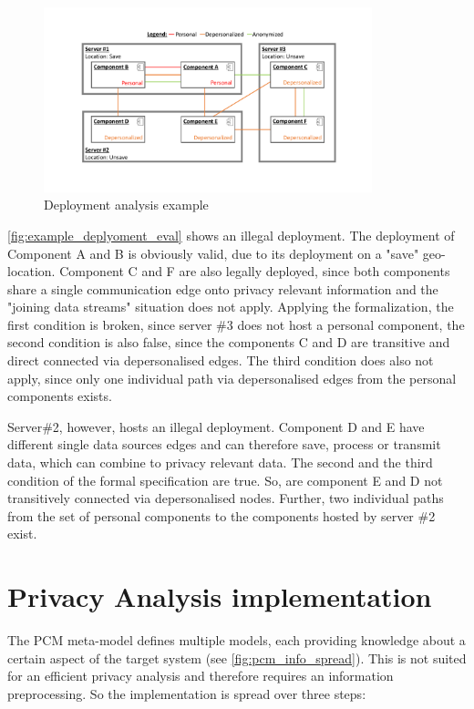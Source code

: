 \begin{figure}[h]
	\centering
	\includegraphics[trim = 35mm 30mm 30mm 25mm, clip, width=0.85\textwidth]{graphs/deployment_example_implementation_eval}
	\caption{Deployment analysis example}
	\label{fig:example_deplyoment_eval}
\end{figure}

\autoref{fig:example_deplyoment_eval} shows an illegal deployment. The deployment of Component A and B is obviously valid, due to its deployment on a "save" geo-location. Component C and F are also legally deployed, since both components share a single communication edge onto privacy relevant information and the "joining data streams" situation does not apply. Applying the formalization, the first condition is broken, since server \#3 does not host a personal component, the second condition is also false, since the components C and D are transitive and direct connected via depersonalised edges. The third condition does also not apply, since only one individual path via depersonalised edges from the personal components exists.

Server\#2, however, hosts an illegal deployment. Component D and E have different single data sources edges and can therefore save, process or transmit data, which can combine to privacy relevant data. The second and the third condition of the formal specification are true. So, are component E and D not transitively connected via depersonalised nodes. Further, two individual paths from the set of personal components to the components hosted by server \#2 exist.


\section{Privacy Analysis implementation}
\label{sec:PrivacyAnalysis:implementation}

The PCM meta-model defines multiple models, each providing knowledge about a certain aspect of the target system (see \autoref{fig:pcm_info_spread}). This is not suited for an efficient privacy analysis and therefore requires an information preprocessing. So the implementation is spread over three steps:

